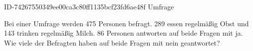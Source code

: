 \begin{exercise}
      {ID-74267550349ee00ca3c80ff1135bcf23fd6ae48f}
      {Umfrage}
  \ifproblem\problem\par
    Bei einer Umfrage werden 475 Personen befragt. 289 essen regelmäßig Obst und
    143 trinken regelmäßig Milch. 86 Personen antworten auf beide Fragen mit ja.
    Wie viele der Befragten haben auf beide Fragen mit nein geantwortet?
  \fi
\end{exercise}
